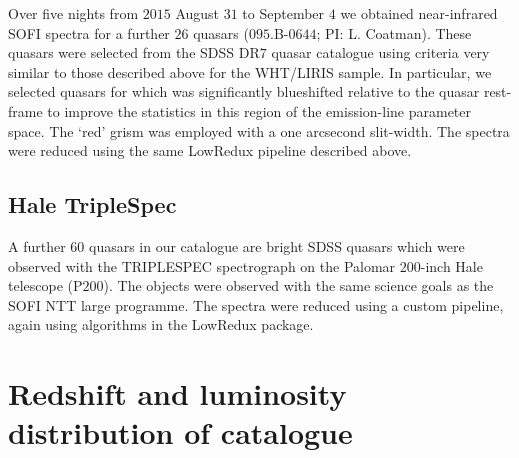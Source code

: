 Over five nights from $2015$ August $31$ to September $4$ we obtained near-infrared SOFI spectra for a further $26$ quasars ($095$.B-$0644$; PI: L. Coatman). 
These quasars were selected from the SDSS DR$7$ quasar catalogue using criteria very similar to those described above for the WHT/LIRIS sample. 
In particular, we selected quasars for which  was significantly blueshifted relative to the quasar rest-frame to improve the statistics in this region of the  emission-line parameter space. 
The `red' grism was employed with a one arcsecond slit-width. 
The spectra were reduced using the same LowRedux pipeline described above. 

\subsection{Hale TripleSpec}

A further $60$ quasars in our catalogue are bright SDSS quasars which were observed with the TRIPLESPEC spectrograph \citep{herter08} on the Palomar $200$-inch Hale telescope (P$200$). 
The objects were observed with the same science goals as the SOFI NTT large programme. 
The spectra were reduced using a custom pipeline, again using algorithms in the LowRedux package. 

\section{Redshift and luminosity distribution of catalogue}

